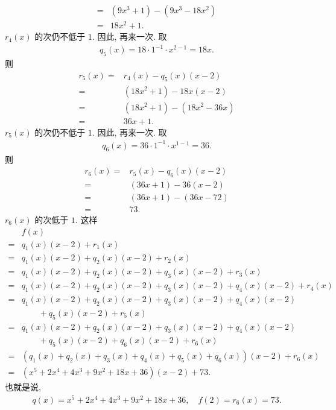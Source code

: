 \begin{example}
\begin{align*}
        = {} & (9x^3 + 1) - (9x^3 - 18x^2) \\
        = {} & 18x^2 + 1.
    \end{align*}
    $r_4 (x)$ 的次仍不低于 $1$. 因此, 再来一次. 取
    \begin{align*}
        q_5 (x) = 18 \cdot 1^{-1} \cdot x^{2-1} = 18x.
    \end{align*}
    则
    \begin{align*}
        r_5 (x)
        = {} & r_4 (x) - q_5 (x) (x - 2)   \\
        = {} & (18x^2 + 1) - 18x (x - 2)   \\
        = {} & (18x^2 + 1) - (18x^2 - 36x) \\
        = {} & 36x + 1.
    \end{align*}
    $r_5 (x)$ 的次仍不低于 $1$. 因此, 再来一次. 取
    \begin{align*}
        q_6 (x) = 36 \cdot 1^{-1} \cdot x^{1-1} = 36.
    \end{align*}
    则
    \begin{align*}
        r_6 (x)
        = {} & r_5 (x) - q_6 (x) (x - 2) \\
        = {} & (36x + 1) - 36 (x - 2)    \\
        = {} & (36x + 1) - (36x - 72)    \\
        = {} & 73.
    \end{align*}
    $r_6 (x)$ 的次低于 $1$. 这样
    \begin{align*}
             & f(x)                                                                        \\
        = {} & q_1 (x) (x-2) + r_1 (x)                                                     \\
        = {} & q_1 (x) (x-2) + q_2 (x) (x-2) + r_2 (x)                                     \\
        = {} & q_1 (x) (x-2) + q_2 (x) (x-2) + q_3 (x) (x-2) + r_3 (x)                     \\
        = {} & q_1 (x) (x-2) + q_2 (x) (x-2) + q_3 (x) (x-2) + q_4 (x) (x-2) + r_4 (x)     \\
        = {} & q_1 (x) (x-2) + q_2 (x) (x-2) + q_3 (x) (x-2) + q_4 (x) (x-2)               \\
             & \qquad + q_5 (x) (x-2) + r_5 (x)                                            \\
        = {} & q_1 (x) (x-2) + q_2 (x) (x-2) + q_3 (x) (x-2) + q_4 (x) (x-2)               \\
             & \qquad + q_5 (x) (x-2) + q_6 (x) (x-2) + r_6 (x)                            \\
        = {} & (q_1 (x) + q_2 (x) + q_3 (x) + q_4 (x) + q_5 (x) + q_6 (x)) (x-2) + r_6 (x) \\
        = {} & (x^5 + 2x^4 + 4x^3 + 9x^2 + 18x + 36) (x-2) + 73.
    \end{align*}
    也就是说,
    \begin{align*}
        q(x) = x^5 + 2x^4 + 4x^3 + 9x^2 + 18x + 36, \quad f(2) = r_6 (x) = 73.
    \end{align*}


\end{example}

